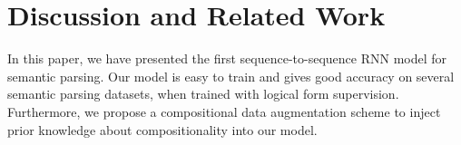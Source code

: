 \documentclass[11pt,letterpaper]{article}
\newcommand{\regex}{\textsc{Regex}\xspace}
\begin{document}
%
%
%

\section{Discussion and Related Work}
\label{sec:discussion}
In this paper, we have presented the first sequence-to-sequence RNN
model for semantic parsing.  Our model is easy to train
and gives good accuracy on several semantic parsing
datasets, when trained with logical form supervision.
Furthermore, we propose a compositional data augmentation scheme
to inject prior knowledge about compositionality into our model.
\end{document}
